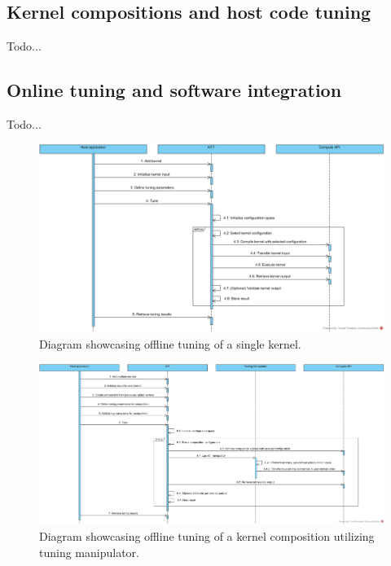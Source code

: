 \documentclass
[
    digital, %
    oneside, %
    table, %
    nolof, %
    nolot, %
    nocover %
]{fithesis3}
\begin{document}
\subsection{Kernel compositions and host code tuning}
Todo...

\subsection{Online tuning and software integration}
Todo...

\clearpage
\thispagestyle{plain}
\begin{figure}
    \begin{adjustwidth}{-3.5cm}{-3.5cm}
        \includegraphics[width=250mm]{resources/ktt_sequence_diagram_single.jpg}
    \end{adjustwidth}
    \caption{Diagram showcasing offline tuning of a single kernel.}
    \label{ktt-sequence-diagram-single}
\end{figure}
\clearpage

\clearpage
\thispagestyle{plain}
\begin{figure}
    \begin{adjustwidth}{-3.5cm}{-3.5cm}
        \includegraphics[width=250mm]{resources/ktt_sequence_diagram_composite.jpg}
    \end{adjustwidth}
    \caption{Diagram showcasing offline tuning of a kernel composition utilizing tuning manipulator.}
    \label{ktt-sequence-diagram-composite}
\end{figure}
\clearpage
\end{document}
